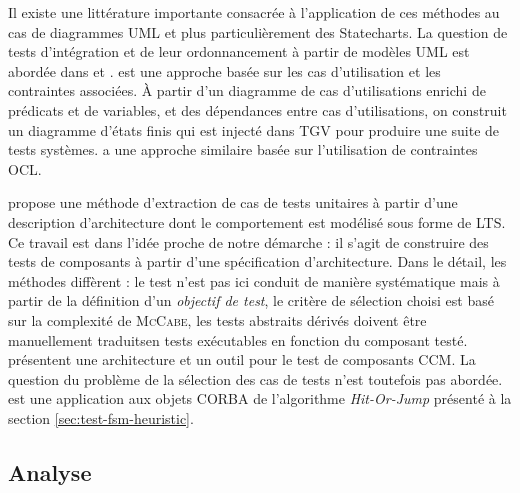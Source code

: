 Il existe une litt\'erature importante consacr\'ee \`a
l'application de ces m\'ethodes au cas de diagrammes \textsf{UML} et
plus particuli\`erement des
Statecharts\cite{jezequel-msc-testd,umlaut,umlinttest,offutt,tdgen-state,testselectstatecharts,scollo-archi-test}.
La question de tests d'int\'egration et de leur ordonnancement \`a
partir de mod\`eles UML est abord\'ee dans \cite{umlinttest} et
\cite{jeron-integ-regr-ootest}. 
\cite{test-pf} est une approche bas\'ee sur les cas d'utilisation et
les contraintes associ\'ees. \`A partir d'un diagramme  de cas
d'utilisations enrichi de pr\'edicats et  de variables, et des
d\'ependances entre cas d'utilisations, on construit
un diagramme d'\'etats finis qui est inject\'e dans \textsf{TGV}
pour produire une suite de tests
syst\`emes. \cite{briand-uml-systesting} a une approche similaire
bas\'ee sur l'utilisation de contraintes \textsf{OCL}. 

\cite{muccini-archi-test} propose une m\'ethode d'extraction de cas
de tests unitaires \`a partir d'une description d'architecture dont
le comportement est mod\'elis\'e sous forme de \textsf{LTS}. Ce
travail est dans l'id\'ee proche de notre d\'emarche : il s'agit de
construire des tests de composants \`a partir d'une sp\'ecification
d'architecture. Dans le d\'etail, les m\'ethodes diff\`erent : le
test n'est pas ici conduit de mani\`ere syst\'ematique mais \`a
partir de la d\'efinition d'un \emph{objectif de test}, le crit\`ere
de s\'election choisi est bas\'e sur la complexit\'e de
\textsc{McCabe}\cite{mccabe-complexity-testing}, les tests abstraits d\'eriv\'es doivent \^etre
manuellement \og traduits\fg en tests ex\'ecutables en fonction du
composant test\'e. 
\cite{tool-ccm-test,ccmtesting} pr\'esentent une architecture et un
outil pour le test de composants \textsf{CCM}. La question du
probl\`eme de la s\'election des cas de tests n'est toutefois pas
abord\'ee. \cite{cavalli-corba-iscc} est une application aux objets
\textsf{CORBA} de l'algorithme \emph{Hit-Or-Jump} pr\'esent\'e \`a
la section \ref{sec:test-fsm-heuristic}. 

\subsection{Analyse}

